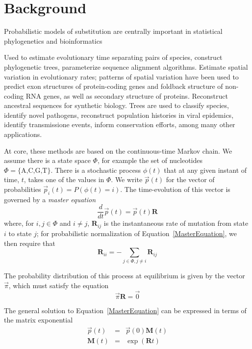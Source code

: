 \documentclass{bmcart}
\newcommand{\matr}[1]{\mathbf{#1}}
\newcommand{\eqref}[1]{Equation~\ref{#1}}
\begin{document}
\section*{Background}

Probabilistic models of substitution are centrally important in statistical phylogenetics and bioinformatics

Used to estimate evolutionary time separating pairs of species,
construct phylogenetic trees,
parameterize sequence alignment algorithms.
Estimate spatial variation in evolutionary rates;
patterns of spatial variation have been used to
predict exon structures of protein-coding genes
and foldback structure of non-coding RNA genes,
as well as secondary structure of proteins.
Reconstruct ancestral sequences for synthetic biology.
Trees are used to classify species,
identify novel pathogens,
reconstruct population histories in viral epidemics,
identify transmissione events,
inform conservation efforts,
among many other applications.

At core, these methods are based on the continuous-time Markov chain.
We assume there is a state space $\Phi$,
for example the set of nucleotides $\Phi = \{ \mbox{A,C,G,T} \}$.
There is a stochastic process $\phi(t)$ that at any given instant of time, $t$,
takes one of the values in $\Phi$.
We write $\vec{p}(t)$ for the vector of probabilities
$\vec{p}_i(t) = P(\phi(t) = i)$.
The time-evolution of this vector is governed by a {\em master equation}
\begin{equation}
\frac{d}{dt} \vec{p}(t) = \vec{p}(t) \matr{R}
\label{MasterEquation}
\end{equation}
where, for $i,j \in \Phi$ and $i \neq j$,
$\matr{R}_{ij}$ is the instantaneous rate of mutation from state $i$ to state $j$;
for probabilistic normalization of \eqref{MasterEquation},
we then require that
\[
\matr{R}_{ii} = -\sum_{j \in \Phi, j \neq i} \matr{R}_{ij}
\]

The probability distribution of this process at equilibrium is given by the vector $\vec{\pi}$,
which must satisfy the equation
\[
\vec{\pi} \matr{R} = \vec{0}
\]

The general solution to \eqref{MasterEquation} can be expressed in terms of the matrix exponential
\begin{eqnarray}
\vec{p}(t) & = & \vec{p}(0) \matr{M}(t) \\
\matr{M}(t) & = & \exp ( \matr{R}t )
\label{MatrixExponential}
\end{eqnarray}
\end{document}
